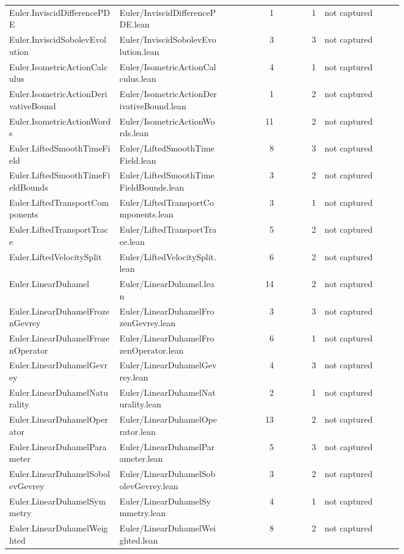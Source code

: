 \documentclass[10pt]{article}
\begin{document}
\begin{longtable}{p{0.28\linewidth}p{0.27\linewidth}r r p{0.20\linewidth}}
Euler.InviscidDifferencePDE & Euler/InviscidDifferencePDE.lean & 1 & 1 & not captured\\
Euler.InviscidSobolevEvolution & Euler/InviscidSobolevEvolution.lean & 3 & 3 & not captured\\
Euler.IsometricActionCalculus & Euler/IsometricActionCalculus.lean & 4 & 1 & not captured\\
Euler.IsometricActionDerivativeBound & Euler/IsometricActionDerivativeBound.lean & 1 & 2 & not captured\\
Euler.IsometricActionWords & Euler/IsometricActionWords.lean & 11 & 2 & not captured\\
Euler.LiftedSmoothTimeField & Euler/LiftedSmoothTimeField.lean & 8 & 3 & not captured\\
Euler.LiftedSmoothTimeFieldBounds & Euler/LiftedSmoothTimeFieldBounds.lean & 3 & 2 & not captured\\
Euler.LiftedTransportComponents & Euler/LiftedTransportComponents.lean & 3 & 1 & not captured\\
Euler.LiftedTransportTrace & Euler/LiftedTransportTrace.lean & 5 & 2 & not captured\\
Euler.LiftedVelocitySplit & Euler/LiftedVelocitySplit.lean & 6 & 2 & not captured\\
Euler.LinearDuhamel & Euler/LinearDuhamel.lean & 14 & 2 & not captured\\
Euler.LinearDuhamelFrozenGevrey & Euler/LinearDuhamelFrozenGevrey.lean & 3 & 3 & not captured\\
Euler.LinearDuhamelFrozenOperator & Euler/LinearDuhamelFrozenOperator.lean & 6 & 1 & not captured\\
Euler.LinearDuhamelGevrey & Euler/LinearDuhamelGevrey.lean & 4 & 3 & not captured\\
Euler.LinearDuhamelNaturality & Euler/LinearDuhamelNaturality.lean & 2 & 1 & not captured\\
Euler.LinearDuhamelOperator & Euler/LinearDuhamelOperator.lean & 13 & 2 & not captured\\
Euler.LinearDuhamelParameter & Euler/LinearDuhamelParameter.lean & 5 & 3 & not captured\\
Euler.LinearDuhamelSobolevGevrey & Euler/LinearDuhamelSobolevGevrey.lean & 3 & 2 & not captured\\
Euler.LinearDuhamelSymmetry & Euler/LinearDuhamelSymmetry.lean & 4 & 1 & not captured\\
Euler.LinearDuhamelWeighted & Euler/LinearDuhamelWeighted.lean & 8 & 2 & not captured\\

\end{longtable}
\end{document}
